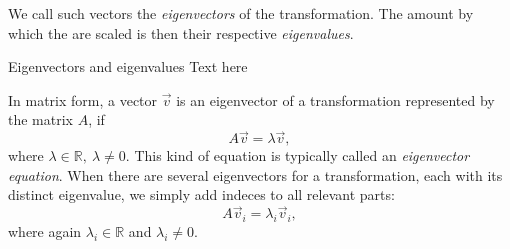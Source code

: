 We call such vectors the \emph{eigenvectors} of the transformation. The amount by which the are scaled is then their respective \emph{eigenvalues}.

\begin{example}{Eigenvectors and eigenvalues}{}
	Text here
\end{example}

In matrix form, a vector $\vec{v}$ is an eigenvector of a transformation represented by the matrix $A$, if
\begin{equation}
	A\vec{v} = \lambda\vec{v},
	\label{eq:eigenvector_matrix_form}
\end{equation}
where $\lambda\in\mathbb{R},\ \lambda\neq0$. This kind of equation is typically called an \emph{eigenvector equation}. When there are several eigenvectors for a transformation, each with its distinct eigenvalue, we simply add indeces to all relevant parts:
\begin{equation}
	A\vec{v}_{i} = \lambda_{i}\vec{v}_{i},
	\label{eq:eigenvector_matrix_form_indeces}
\end{equation}
where again $\lambda_{i}\in\mathbb{R}$ and $\lambda_{i}\neq0$.

